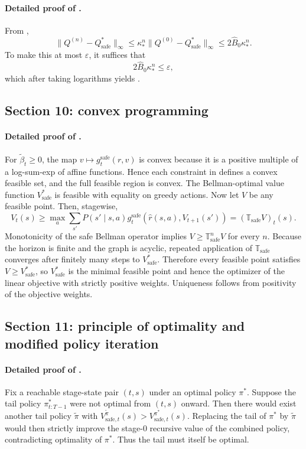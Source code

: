 \documentclass{article}
\theoremstyle{remark}
\newcommand{\safe}{\mathrm{safe}}
\newcommand{\Bhat}{\widehat B}
\begin{document}
\paragraph{Detailed proof of .}
From ,
\[
\|Q^{(n)}-Q_\safe^*\|_\infty\le \kappa_*^n \|Q^{(0)}-Q_\safe^*\|_\infty\le 2\Bhat_0\kappa_*^n.
\]
To make this at most $\varepsilon$, it suffices that
\[
2\Bhat_0\kappa_*^n\le \varepsilon,
\]
which after taking logarithms yields .

\subsection{Section 10: convex programming}
\label{app:lp}

\paragraph{Detailed proof of .}
For $\widetilde\beta_t\ge 0$, the map $v\mapsto g_t^{\safe}(r,v)$ is convex because it is a positive multiple of a log-sum-exp of affine functions.
Hence each constraint in  defines a convex feasible set, and the full feasible region is convex.
The Bellman-optimal value function $V_\safe^*$ is feasible with equality on greedy actions.
Now let $V$ be any feasible point.
Then, stagewise,
\[
V_t(s)\ge \max_a \sum_{s'}P(s'\mid s,a)g_t^{\safe}(\hat r(s,a),V_{t+1}(s'))=(\mathbb T_\safe V)_t(s).
\]
Monotonicity of the safe Bellman operator implies $V\ge \mathbb T_\safe^nV$ for every $n$.
Because the horizon is finite and the graph is acyclic, repeated application of $\mathbb T_\safe$ converges after finitely many steps to $V_\safe^*$.
Therefore every feasible point satisfies $V\ge V_\safe^*$, so $V_\safe^*$ is the minimal feasible point and hence the optimizer of the linear objective with strictly positive weights.
Uniqueness follows from positivity of the objective weights.

\subsection{Section 11: principle of optimality and modified policy iteration}
\label{app:principle-mpi}

\paragraph{Detailed proof of .}
Fix a reachable stage-state pair $(t,s)$ under an optimal policy $\pi^*$.
Suppose the tail policy $\pi^*_{t:T-1}$ were not optimal from $(t,s)$ onward.
Then there would exist another tail policy $\tilde\pi$ with $V_{\safe,t}^{\tilde\pi}(s)>V_{\safe,t}^{\pi^*}(s)$.
Replacing the tail of $\pi^*$ by $\tilde\pi$ would then strictly improve the stage-$0$ recursive value of the combined policy, contradicting optimality of $\pi^*$.
Thus the tail must itself be optimal.
\end{document}
